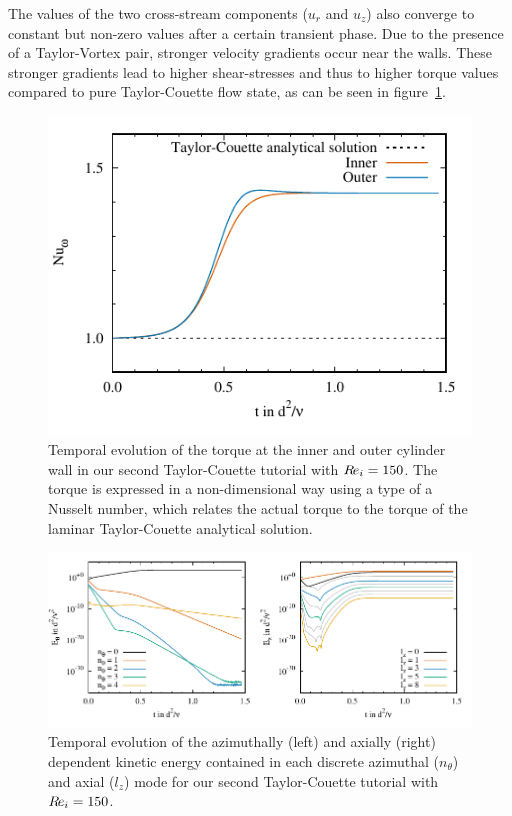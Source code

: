 \documentclass[a4paper, 11pt, DIV=11]{scrartcl}
\begin{document}
The values of the two
cross-stream components ($u_r$ and $u_z$) also converge to constant
but non-zero values after a certain transient phase. Due to the presence
of a Taylor-Vortex pair, stronger velocity gradients occur near the
walls. These stronger gradients lead to higher shear-stresses and thus
to higher torque values compared to pure Taylor-Couette flow state,
as can be seen in figure~\ref{fig:tc0041torque}.
\begin{figure}[htb]
\centering
\includegraphics[scale=1.0, trim=0mm 0mm 0mm 0mm, clip=true]{figures/tc0041/torque}
\caption{Temporal evolution of the torque at the inner and outer cylinder
wall in our second Taylor-Couette tutorial  with $R\hspace{-0.1em}e_{i}=\num{150}$.
The torque is expressed in a non-dimensional way using a type of a Nusselt
number, which relates the actual torque to the torque of the laminar
Taylor-Couette analytical solution.}
\label{fig:tc0041torque}
\end{figure}

\begin{figure}[htb]
\centering
\includegraphics[scale=1.00]{figures/tc0041/keThZ.pdf}
\caption{Temporal evolution of the azimuthally (left) and axially (right) 
dependent kinetic energy contained in each discrete azimuthal ($n_{\theta}$)
and axial ($l_{z}$) mode for our second Taylor-Couette tutorial 
with $R\hspace{-0.1em}e_{i}=\num{150}$.}
\label{fig:tc0041keThZ}
\end{figure}
\end{document}

